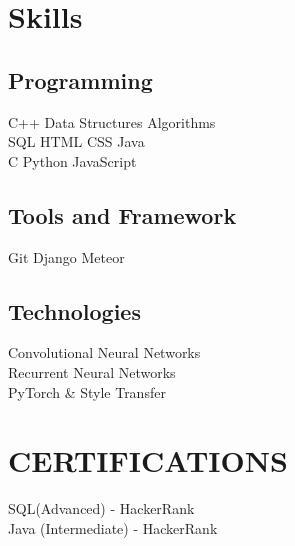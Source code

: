 \documentclass[]{deedy-resume-openfont}
\begin{document}
\begin{minipage}[t]{0.31\textwidth}

\section{Skills}
\subsection{Programming}
C++ \textbullet{} Data Structures  \textbullet{} Algorithms \\ 
\textbullet{} SQL \textbullet{} HTML \textbullet{}  CSS \textbullet{}  Java \\
\textbullet{} C \textbullet{} Python \textbullet{} JavaScript \\
\sectionsep
\subsection{Tools and Framework}
Git \textbullet{} Django \textbullet{} Meteor
\sectionsep
\subsection{Technologies}
\textbullet{} Convolutional Neural Networks \\
\textbullet{} Recurrent Neural Networks \\
\textbullet{} PyTorch \& Style Transfer\\
\sectionsep

\section{ CERTIFICATIONS}

 \textbullet{} SQL(Advanced) - HackerRank\\
 \textbullet{} Java (Intermediate) - HackerRank\\

%
%

\end{minipage} 
\hfill
\end{document}
